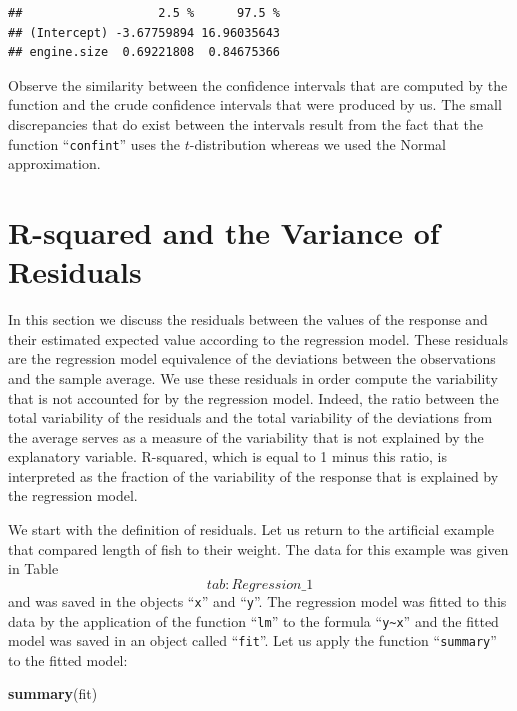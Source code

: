\documentclass[]{krantz}
\makeatletter
\newenvironment{Shaded}{\begin{snugshade}}{\end{snugshade}}
\newcommand{\KeywordTok}[1]{\textcolor[rgb]{0.13,0.29,0.53}{\textbf{#1}}}
\newcommand{\NormalTok}[1]{#1}
\newenvironment{kframe}{%
\medskip{}
\setlength{\fboxsep}{.8em}
 \def\at@end@of@kframe{}%
 \ifinner\ifhmode%
  \def\at@end@of@kframe{\end{minipage}}%
  \begin{minipage}{\columnwidth}%
 \fi\fi%
 \def\FrameCommand##1{\hskip\@totalleftmargin \hskip-\fboxsep
 \colorbox{shadecolor}{##1}\hskip-\fboxsep
     \hskip-\linewidth \hskip-\@totalleftmargin \hskip\columnwidth}%
 \MakeFramed {\advance\hsize-\width
   \@totalleftmargin\z@ \linewidth\hsize
   \@setminipage}}%
 {\par\unskip\endMakeFramed%
 \at@end@of@kframe}
\renewenvironment{Shaded}{\begin{kframe}}{\end{kframe}}
\theoremstyle{definition}
\theoremstyle{definition}
\theoremstyle{definition}
\theoremstyle{remark}
\makeatother
\begin{document}
\begin{verbatim}
##                   2.5 %      97.5 %
## (Intercept) -3.67759894 16.96035643
## engine.size  0.69221808  0.84675366
\end{verbatim}

Observe the similarity between the confidence intervals that are
computed by the function and the crude confidence intervals that were
produced by us. The small discrepancies that do exist between the
intervals result from the fact that the function ``\texttt{confint}''
uses the \(t\)-distribution whereas we used the Normal approximation.

\section{R-squared and the Variance of
Residuals}\label{r-squared-and-the-variance-of-residuals}

In this section we discuss the residuals between the values of the
response and their estimated expected value according to the regression
model. These residuals are the regression model equivalence of the
deviations between the observations and the sample average. We use these
residuals in order compute the variability that is not accounted for by
the regression model. Indeed, the ratio between the total variability of
the residuals and the total variability of the deviations from the
average serves as a measure of the variability that is not explained by
the explanatory variable. R-squared, which is equal to 1 minus this
ratio, is interpreted as the fraction of the variability of the response
that is explained by the regression model.

We start with the definition of residuals. Let us return to the
artificial example that compared length of fish to their weight. The
data for this example was given in Table~\[tab:Regression\_1\] and was
saved in the objects ``\texttt{x}'' and ``\texttt{y}''. The regression
model was fitted to this data by the application of the function
``\texttt{lm}'' to the formula ``\texttt{y\textasciitilde{}x}'' and the
fitted model was saved in an object called ``\texttt{fit}''. Let us
apply the function ``\texttt{summary}'' to the fitted model:

\begin{Shaded}
\begin{Highlighting}[]
\KeywordTok{summary}\NormalTok{(fit)}
\end{Highlighting}
\end{Shaded}
\end{document}
